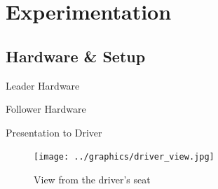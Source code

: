 \documentclass{beamer}
\begin{document}
\section{Experimentation}

  \subsection{Hardware \& Setup}

    \begin{frame}{Leader Hardware}
    \end{frame}

    \begin{frame}{Follower Hardware}
    \end{frame}

    \begin{frame}{Presentation to Driver}
      \begin{figure}[ht] \centering
        \texttt{[image: ../graphics/driver\_view.jpg]}
        \caption{View from the driver's seat} \label{fig:driver_view}
      \end{figure}
    \end{frame}

  \subsection{}
\end{document}
